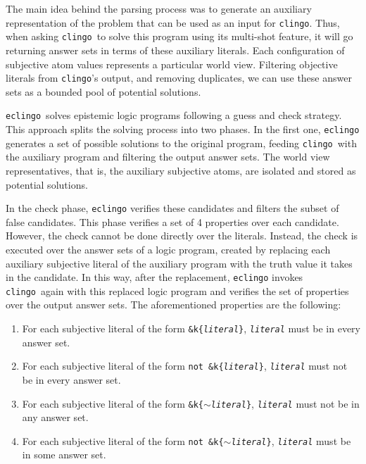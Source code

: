 \documentclass{new_tlp}
\def\eclingo{{\tt eclingo}}
\def\clingo{{\tt clingo}}
\begin{document}
The main idea behind the parsing process was to generate an auxiliary representation of the problem that can be used as an input for \clingo.
Thus, when asking \clingo\ to solve this program using its multi-shot feature, it will go returning answer sets in terms of these auxiliary literals.
Each configuration of subjective atom values represents a particular world view.
Filtering objective literals from \clingo's output, and removing duplicates, we can use these answer sets as a bounded pool of potential solutions.

\eclingo\ solves epistemic logic programs following a guess and check strategy.
This approach splits the solving process into two phases.
In the first one, \eclingo{} generates a set of possible solutions to the original program, feeding \clingo\ with the auxiliary program and filtering
the output answer sets.
The world view representatives, that is, the auxiliary subjective atoms, are isolated and stored as potential solutions.

In the check phase, \eclingo{} verifies these candidates and filters the subset of false candidates.
This phase verifies a set of 4 properties over each candidate.
However, the check cannot be done directly over the literals.
Instead, the check is executed over the answer sets of a logic program, created by replacing each auxiliary subjective literal of the auxiliary
program with the truth value it takes in the candidate.
In this way, after the replacement, \eclingo{} invokes \clingo\ again with this replaced logic program and verifies the set of properties over the
output answer sets.
The aforementioned properties are the following:
\begin{enumerate}
    \item For each subjective literal of the form \texttt{\&k\{\emph{literal}\}}, \texttt{\emph{literal}} must be in every answer set.

    \item For each subjective literal of the form \texttt{not \&k\{\emph{literal}\}}, \texttt{\emph{literal}} must not be in every answer set.

    \item For each subjective literal of the form \texttt{\&k\{$\sim$\emph{literal}\}}, \texttt{\emph{literal}} must not be in any answer set.

    \item For each subjective literal of the form \texttt{not \&k\{$\sim$\emph{literal}\}}, \texttt{\emph{literal}} must be in some answer set.
\end{enumerate}
\end{document}
